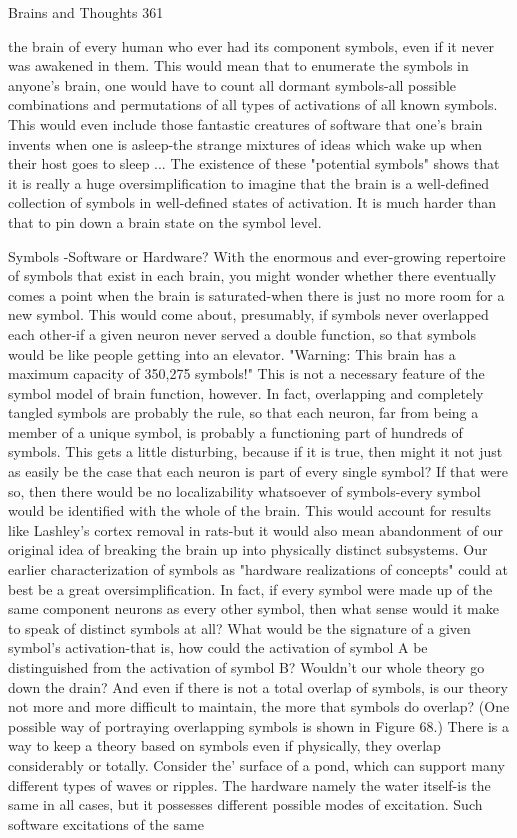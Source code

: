 Brains and Thoughts                                                                    361

the brain of every human who ever had its component symbols, even if it never was
awakened in them. This would mean that to enumerate the symbols in anyone's brain, one
would have to count all dormant symbols-all possible combinations and permutations of
all types of activations of all known symbols. This would even include those fantastic
creatures of software that one's brain invents when one is asleep-the strange mixtures of
ideas which wake up when their host goes to sleep ... The existence of these "potential
symbols" shows that it is really a huge oversimplification to imagine that the brain is a
well-defined collection of symbols in well-defined states of activation. It is much harder
than that to pin down a brain state on the symbol level.

                        Symbols -Software or Hardware?
  With the enormous and ever-growing repertoire of symbols that exist in each brain, you
might wonder whether there eventually comes a point when the brain is saturated-when
there is just no more room for a new symbol. This would come about, presumably, if
symbols never overlapped each other-if a given neuron never served a double function, so
that symbols would be like people getting into an elevator. "Warning: This brain has a
maximum capacity of 350,275 symbols!"
  This is not a necessary feature of the symbol model of brain function, however. In fact,
overlapping and completely tangled symbols are probably the rule, so that each neuron,
far from being a member of a unique symbol, is probably a functioning part of hundreds
of symbols. This gets a little disturbing, because if it is true, then might it not just as
easily be the case that each neuron is part of every single symbol? If that were so, then
there would be no localizability whatsoever of symbols-every symbol would be identified
with the whole of the brain. This would account for results like Lashley's cortex removal
in rats-but it would also mean abandonment of our original idea of breaking the brain up
into physically distinct subsystems. Our earlier characterization of symbols as "hardware
realizations of concepts" could at best be a great oversimplification. In fact, if every
symbol were made up of the same component neurons as every other symbol, then what
sense would it make to speak of distinct symbols at all? What would be the signature of a
given symbol's activation-that is, how could the activation of symbol A be distinguished
from the activation of symbol B? Wouldn't our whole theory go down the drain? And
even if there is not a total overlap of symbols, is our theory not more and more difficult to
maintain, the more that symbols do overlap? (One possible way of portraying
overlapping symbols is shown in Figure 68.)
  There is a way to keep a theory based on symbols even if physically, they overlap
considerably or totally. Consider the' surface of a pond, which can support many different
types of waves or ripples. The hardware namely the water itself-is the same in all cases,
but it possesses different possible modes of excitation. Such software excitations of the
same




